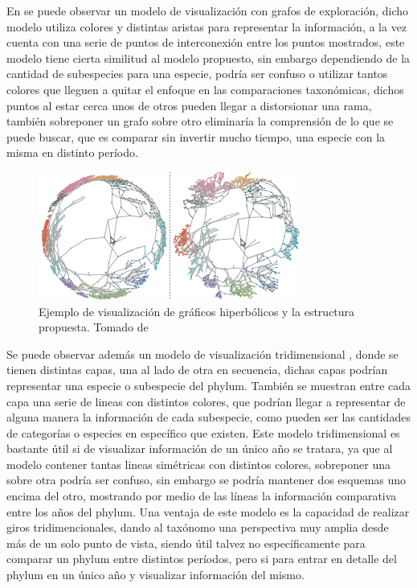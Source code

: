 \documentclass[journal]{IEEEtran}
\begin{document}
En \cite{graph-explore} se puede observar un modelo de visualización con grafos de exploración, dicho modelo utiliza colores y distintas aristas para representar la información, a la vez cuenta con una serie de puntos de interconexión entre los puntos mostrados, este modelo tiene cierta similitud al modelo propuesto, sin embargo dependiendo de la cantidad de subespecies para una especie, podría ser confuso o utilizar tantos colores que lleguen a quitar el enfoque en las comparaciones taxonómicas, dichos puntos al estar cerca unos de otros pueden llegar a distorsionar una rama, también sobreponer un grafo sobre otro eliminaría la comprensión de lo que se puede buscar, que es comparar sin invertir mucho tiempo, una especie con la misma en distinto período.
\begin{figure}[]
  \centering
  \includegraphics[scale=0.6]{graphs-exploration}
  \caption{Ejemplo de visualización de gráficos hiperbólicos y la estructura propuesta. Tomado de \cite{graph-explore}}
\end{figure}

Se puede observar además un modelo de visualización tridimensional \cite{phylo-scheme}, donde se tienen distintas capas, una al lado de otra en secuencia, dichas capas podrían representar una especie o subespecie del phylum. También se muestran entre cada capa una serie de lineas con distintos colores, que podrían llegar a representar de alguna manera la información de cada subespecie, como pueden ser las cantidades de categorías o especies en específico que existen. Este modelo tridimensional es bastante útil si de visualizar información de un único año se tratara, ya que al modelo contener tantas lineas simétricas con distintos colores, sobreponer una sobre otra podría ser confuso, sin embargo se podría mantener dos esquemas uno encima del otro, mostrando por medio de las líneas la información comparativa entre los años del phylum. Una ventaja de este modelo es la capacidad de realizar giros tridimencionales, dando al taxónomo una perspectiva muy amplia desde más de un solo punto de vista, siendo útil talvez no específicamente para comparar un phylum entre distintos períodos, pero si para entrar en detalle del phylum en un único año y visualizar información del mismo.
\end{document}
